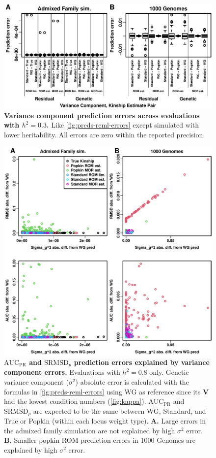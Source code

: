 \documentclass[11pt]{article}
\newcommand{\rmsd}{\text{SRMSD}_p}
\newcommand{\auc}{\text{AUC}_\text{PR}}
\begin{document}
\begin{figure}[bp!]
  \centering
  \includegraphics[width=\textwidth]{h-0.3/preds-reml-errors.pdf}
  \caption{
    {\bf Variance component prediction errors across evaluations with $h^2=0.3$.}
    Like \cref{fig:preds-reml-errors} except simulated with lower heritability.
    All errors are zero within the reported precision.
  }
  \label{fig:preds-reml-errors-h3}
\end{figure}

\begin{figure}[bp!]
  \centering
  \includegraphics[width=\textwidth]{reml-err-vs-pred-err.pdf}
  \caption{
    {\bf $\auc$ and $\rmsd$ prediction errors explained by variance component errors.}
    Evaluations with $h^2=0.8$ only.
    Genetic variance component ($\sigma^2$) absolute error is calculated with the formulas in \cref{fig:preds-reml-errors} using WG as reference since its $\mathbf{V}$ had the lowest condition numbers (\cref{fig:kappa}).
    $\auc$ and $\rmsd$ are expected to be the same between WG, Standard, and True or Popkin (within each locus weight type).
    \textbf{A.}
    Large errors in the admixed family simulation are not explained by high $\sigma^2$ error.
    \textbf{B.}
    Smaller popkin ROM prediction errors in 1000 Genomes are explained by high $\sigma^2$ error.
  }
  \label{fig:reml-err-vs-pred-err}
\end{figure}
\end{document}
